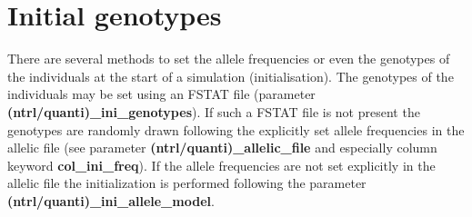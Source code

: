\documentclass[letterpaper,12pt,oneside]{book}
\begin{document}
\section{Initial genotypes}\label{iniGenoQuanti}
There are several methods to set the allele frequencies or even the genotypes of the individuals at the start of a simulation (initialisation). The genotypes of the individuals may be set using an FSTAT file \citep{Goudet_1995} (parameter \textbf{(ntrl/quanti)\_ini\_genotypes}). If such a FSTAT file is not present the genotypes are randomly drawn following the explicitly set allele frequencies in the allelic file (see parameter \textbf{(ntrl/quanti)\_allelic\_file} and especially column keyword \textbf{col\_ini\_freq}). If the allele frequencies are not set explicitly in the allelic file the initialization is performed following the parameter \textbf{(ntrl/quanti)\_ini\_allele\_model}.  
\end{document}
